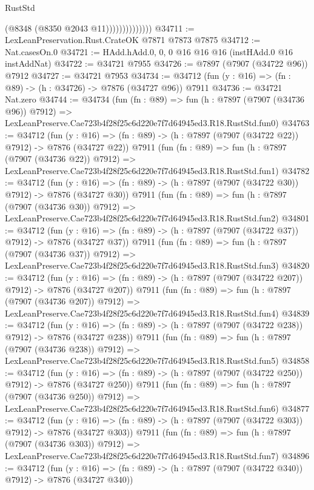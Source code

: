 \begin{lexlean}{RustStd}
\begin{coremodule}
                            (@8348 (@8350 @2043 @11))))))))))))))
@34711 := LexLeanPreservation.Rust.CrateOK @7871 @7873 @7875
@34712 := Nat.casesOn.{0}
@34721 := HAdd.hAdd.{0, 0, 0} @16 @16 @16 (instHAdd.{0} @16 instAddNat)
@34722 := @34721 @7955
@34726 := @7897 (@7907 (@34722 @96)) @7912
@34727 := @34721 @7953
@34734 := @34712 (fun (y : @16) => (fn : @89) -> (h : @34726) -> @7876 (@34727 @96)) @7911
@34736 := @34721 Nat.zero
@34744 := @34734
    (fun (fn : @89) =>
    fun (h : @7897 (@7907 (@34736 @96)) @7912) =>
    LexLeanPreserve.Cae723b4f28f25c6d220e7f7d64945ed3.R18.RustStd.fun0)
@34763 := @34712
    (fun (y : @16) => (fn : @89) -> (h : @7897 (@7907 (@34722 @22)) @7912) -> @7876 (@34727 @22))
    @7911
    (fun (fn : @89) =>
    fun (h : @7897 (@7907 (@34736 @22)) @7912) =>
    LexLeanPreserve.Cae723b4f28f25c6d220e7f7d64945ed3.R18.RustStd.fun1)
@34782 := @34712
    (fun (y : @16) => (fn : @89) -> (h : @7897 (@7907 (@34722 @30)) @7912) -> @7876 (@34727 @30))
    @7911
    (fun (fn : @89) =>
    fun (h : @7897 (@7907 (@34736 @30)) @7912) =>
    LexLeanPreserve.Cae723b4f28f25c6d220e7f7d64945ed3.R18.RustStd.fun2)
@34801 := @34712
    (fun (y : @16) => (fn : @89) -> (h : @7897 (@7907 (@34722 @37)) @7912) -> @7876 (@34727 @37))
    @7911
    (fun (fn : @89) =>
    fun (h : @7897 (@7907 (@34736 @37)) @7912) =>
    LexLeanPreserve.Cae723b4f28f25c6d220e7f7d64945ed3.R18.RustStd.fun3)
@34820 := @34712
    (fun (y : @16) => (fn : @89) -> (h : @7897 (@7907 (@34722 @207)) @7912) -> @7876 (@34727 @207))
    @7911
    (fun (fn : @89) =>
    fun (h : @7897 (@7907 (@34736 @207)) @7912) =>
    LexLeanPreserve.Cae723b4f28f25c6d220e7f7d64945ed3.R18.RustStd.fun4)
@34839 := @34712
    (fun (y : @16) => (fn : @89) -> (h : @7897 (@7907 (@34722 @238)) @7912) -> @7876 (@34727 @238))
    @7911
    (fun (fn : @89) =>
    fun (h : @7897 (@7907 (@34736 @238)) @7912) =>
    LexLeanPreserve.Cae723b4f28f25c6d220e7f7d64945ed3.R18.RustStd.fun5)
@34858 := @34712
    (fun (y : @16) => (fn : @89) -> (h : @7897 (@7907 (@34722 @250)) @7912) -> @7876 (@34727 @250))
    @7911
    (fun (fn : @89) =>
    fun (h : @7897 (@7907 (@34736 @250)) @7912) =>
    LexLeanPreserve.Cae723b4f28f25c6d220e7f7d64945ed3.R18.RustStd.fun6)
@34877 := @34712
    (fun (y : @16) => (fn : @89) -> (h : @7897 (@7907 (@34722 @303)) @7912) -> @7876 (@34727 @303))
    @7911
    (fun (fn : @89) =>
    fun (h : @7897 (@7907 (@34736 @303)) @7912) =>
    LexLeanPreserve.Cae723b4f28f25c6d220e7f7d64945ed3.R18.RustStd.fun7)
@34896 := @34712
    (fun (y : @16) => (fn : @89) -> (h : @7897 (@7907 (@34722 @340)) @7912) -> @7876 (@34727 @340))

\end{coremodule}
\end{lexlean}
